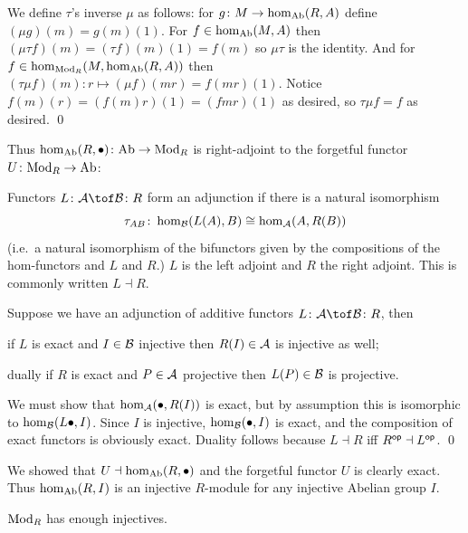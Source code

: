 \elemm

\bproof

    We define $\tau$'s inverse $\mu$ as follows: for $g\colon M\to\hom_{\rm Ab}(R,A)$ define $(\mu g)(m)=g(m)(1)$.
    For $f\in\hom_{\rm Ab}(M,A)$ then $(\mu\tau f)(m)=(\tau f)(m)(1)=f(m)$ so $\mu\tau$ is the identity.
    And for $f\in\hom_{{\rm Mod}_R}(M,\hom_{\rm Ab}(R,A))$ then $(\tau\mu f)(m)\colon r\mapsto(\mu f)(mr)=f(mr)(1)$.
    Notice $f(m)(r)=(f(m)r)(1)=(fmr)(1)$ as desired, so $\tau\mu f=f$ as desired.
    \qed

\eproof

Thus $\hom_{\rm Ab}(R,\bullet)\colon{\rm Ab}\to{\rm Mod}_R$ is {\emphcolor right-adjoint} to the forgetful functor $U\colon{\rm Mod}_R\to{\rm Ab}$:

\bdefn

    Functors $L\colon\A\tof\B\colon R$ form an {\emphcolor adjunction} if there is a natural isomorphism
    $$ \tau_{AB}\colon\hom_{{\cal B}}(L(A),B) \cong \hom_{{\cal A}}(A,R(B)) $$
    (i.e.\ a natural isomorphism of the bifunctors given by the compositions of the hom-functors and $L$ and $R$.)
    $L$ is the {\emphcolor left adjoint} and $R$ the {\emphcolor right adjoint}.
    This is commonly written $L\dashv R$.

\edefn

\bprop

    Suppose we have an adjunction of additive functors $L\colon\A\tof\B\colon R$, then
    \benum
        \item if $L$ is exact and $I\in{{\cal B}}$ injective then $R(I)\in{{\cal A}}$ is injective as well;
        \item dually if $R$ is exact and $P\in{{\cal A}}$ projective then $L(P)\in{{\cal B}}$ is projective.
    \eenum

\eprop

\bproof

    We must show that $\hom_{{\cal A}}(\bullet,R(I))$ is exact, but by assumption this is isomorphic to $\hom_{{\cal B}}(L\bullet,I)$.
    Since $I$ is injective, $\hom_{{\cal B}}(\bullet,I)$ is exact, and the composition of exact functors is obviously exact.
    Duality follows because $L\dashv R$ iff $R^{\sf op}\dashv L^{\sf op}$.
    \qed

\eproof

We showed that $U\dashv\hom_{\rm Ab}(R,\bullet)$ and the forgetful functor $U$ is clearly exact.
Thus $\hom_{\rm Ab}(R,I)$ is an injective $R$-module for any injective Abelian group $I$.

\bthrm

    ${\rm Mod}_R$ has enough injectives.

\ethrm

